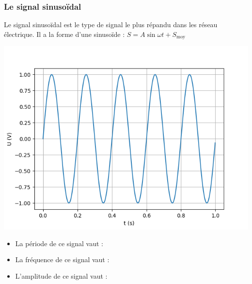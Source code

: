 \documentclass[10pt,fleqn]{article} %
\begin{document}
    \subsubsection{Le signal sinusoïdal}
    Le signal sinusoïdal est le type de signal le plus répandu dans les réseau électrique. Il a la forme d'une sinusoïde : $S = A\sin{\omega t} + S_\text{moy}$

    \begin{center}
        \includegraphics[height=0.3\textheight]{images/sinus.png}
    \end{center}
    \begin{itemize}
        \item La période de ce signal vaut : 
        \item La fréquence de ce signal vaut : 
        \item  L'amplitude de ce signal vaut : 
    \end{itemize}
\end{document}
